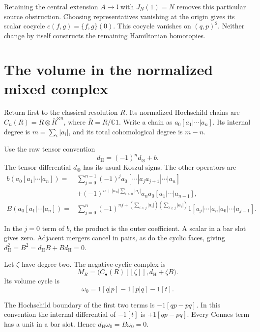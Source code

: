 Retaining the central extension $A\to\mathfrak l$ with
$J_N(1)=N$ removes this particular source obstruction.
Choosing representatives vanishing at the origin gives its
scalar cocycle $c(f,g)=\{f,g\}(0)$. This cocycle vanishes on
$(q,p)^2$. Neither change by itself constructs the remaining
Hamiltonian homotopies.

\section{The volume in the normalized mixed complex}

Return first to the classical resolution $R$. Its normalized
Hochschild chains are
$C_n(R)=R\otimes\overline R^{\otimes n}$, where
$\overline R=R/\mathbb C1$. Write a chain as
$a_0[a_1|\cdots|a_n]$. Its internal degree is
$m=\sum_i|a_i|$, and its total cohomological degree is $m-n$.

Use the raw tensor convention
\begin{equation}\label{mht:eq:raw-mixed-convention}
 d_{\mathrm H}=(-1)^n d_\otimes+b.
\end{equation}
The tensor differential $d_\otimes$ has its usual Koszul
signs. The other operators are
\begin{align*}
 b(a_0[a_1|\cdots|a_n])
 ={}&\sum_{j=0}^{n-1}(-1)^j
       a_0[\cdots|a_ja_{j+1}|\cdots|a_n]\\
 &+(-1)^{n+|a_n|\sum_{i<n}|a_i|}
       a_na_0[a_1|\cdots|a_{n-1}],\\
 B(a_0[a_1|\cdots|a_n])
 ={}&\sum_{j=0}^n
   (-1)^{nj+(\sum_{i<j}|a_i|)(\sum_{i\geq j}|a_i|)}
   1[a_j|\cdots|a_n|a_0|\cdots|a_{j-1}].
\end{align*}

In the $j=0$ term of $b$, the product is the outer
coefficient. A scalar in a bar slot gives zero. Adjacent
mergers cancel in pairs, as do the cyclic faces, giving
$d_{\mathrm H}^2=B^2=d_{\mathrm H}B+Bd_{\mathrm H}=0$.

Let $\zeta$ have degree two. The negative-cyclic complex is
\[
 M_R=\bigl(C_\bullet(R)[[\zeta]],
                  d_{\mathrm H}+\zeta B\bigr).
\]
Its volume cycle is
\begin{equation}\label{mht:eq:resolved-volume-cycle}
 \omega_0=1[q|p]-1[p|q]-1[t].
\end{equation}

The Hochschild boundary of the first two terms is
$-1[qp-pq]$. In this convention the internal differential
of $-1[t]$ is $+1[qp-pq]$. Every Connes term has a unit in
a bar slot. Hence $d_{\mathrm H}\omega_0=B\omega_0=0$.


